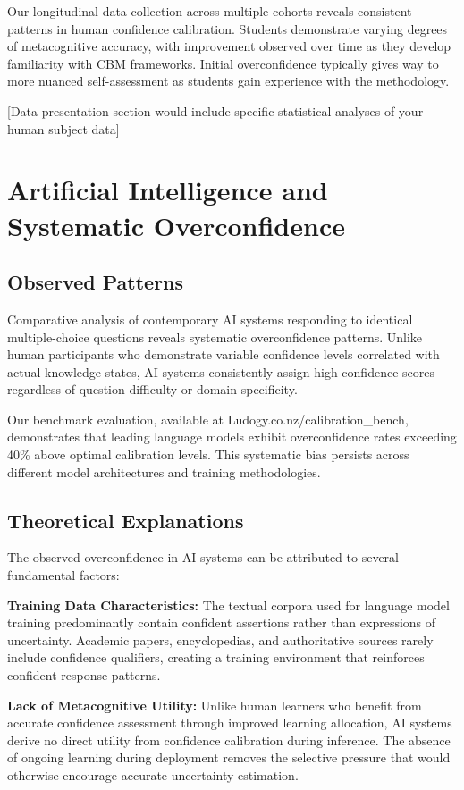 \documentclass[sigconf]{acmart}
\begin{document}
Our longitudinal data collection across multiple cohorts reveals consistent patterns in human confidence calibration. Students demonstrate varying degrees of metacognitive accuracy, with improvement observed over time as they develop familiarity with CBM frameworks. Initial overconfidence typically gives way to more nuanced self-assessment as students gain experience with the methodology.

[Data presentation section would include specific statistical analyses of your human subject data]

\section{Artificial Intelligence and Systematic Overconfidence}

\subsection{Observed Patterns}

Comparative analysis of contemporary AI systems responding to identical multiple-choice questions reveals systematic overconfidence patterns. Unlike human participants who demonstrate variable confidence levels correlated with actual knowledge states, AI systems consistently assign high confidence scores regardless of question difficulty or domain specificity.

Our benchmark evaluation, available at Ludogy.co.nz/calibration\_bench, demonstrates that leading language models exhibit overconfidence rates exceeding 40\% above optimal calibration levels. This systematic bias persists across different model architectures and training methodologies.

\subsection{Theoretical Explanations}

The observed overconfidence in AI systems can be attributed to several fundamental factors:

\textbf{Training Data Characteristics:} The textual corpora used for language model training predominantly contain confident assertions rather than expressions of uncertainty. Academic papers, encyclopedias, and authoritative sources rarely include confidence qualifiers, creating a training environment that reinforces confident response patterns.

\textbf{Lack of Metacognitive Utility:} Unlike human learners who benefit from accurate confidence assessment through improved learning allocation, AI systems derive no direct utility from confidence calibration during inference. The absence of ongoing learning during deployment removes the selective pressure that would otherwise encourage accurate uncertainty estimation.
\end{document}
